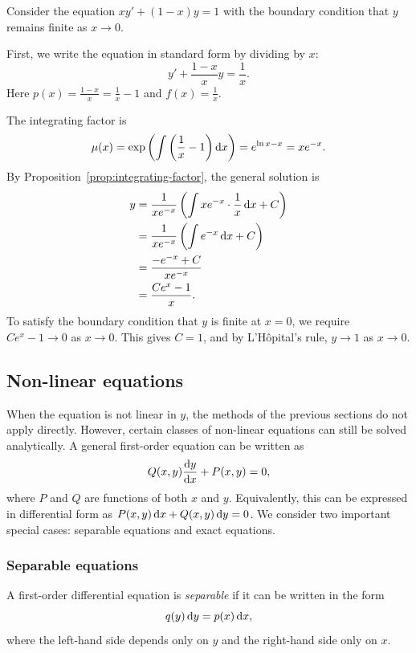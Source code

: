 \documentclass[a4paper]{article}
\begin{document}
\begin{eg}
  Consider the equation $xy' + (1 - x)y = 1$ with the boundary condition that $y$ remains finite as $x \to 0$.

  First, we write the equation in standard form by dividing by $x$:
  \[
    y' + \frac{1 - x}{x} y = \frac{1}{x}.
  \]
  Here $p(x) = \frac{1-x}{x} = \frac{1}{x} - 1$ and $f(x) = \frac{1}{x}$.

  The integrating factor is
  \[
    \mu(x) = \exp\left(\int \left(\frac{1}{x} - 1\right)\mathrm{d} x\right) = e^{\ln x - x} = xe^{-x}.
  \]
  By Proposition~\ref{prop:integrating-factor}, the general solution is
  \begin{align*}
    y &= \frac{1}{xe^{-x}}\left(\int xe^{-x} \cdot \frac{1}{x}\,\mathrm{d} x + C\right)\\
    &= \frac{1}{xe^{-x}}\left(\int e^{-x}\,\mathrm{d} x + C\right)\\
    &= \frac{-e^{-x} + C}{xe^{-x}}\\
    &= \frac{Ce^x - 1}{x}.
  \end{align*}
  To satisfy the boundary condition that $y$ is finite at $x = 0$, we require $Ce^x - 1 \to 0$ as $x \to 0$. This gives $C = 1$, and by L'H\^opital's rule, $y \to 1$ as $x \to 0$.
\end{eg}

\subsection{Non-linear equations}
\begin{remark}
  When the equation is not linear in $y$, the methods of the previous sections do not apply directly. However, certain classes of non-linear equations can still be solved analytically. A general first-order equation can be written as
  \[
    Q(x, y)\frac{\mathrm{d} y}{\mathrm{d} x} + P(x, y) = 0,
  \]
  where $P$ and $Q$ are functions of both $x$ and $y$. Equivalently, this can be expressed in differential form as $P(x,y)\,\mathrm{d} x + Q(x,y)\,\mathrm{d} y = 0$. We consider two important special cases: separable equations and exact equations.
\end{remark}

\subsubsection{Separable equations}
\begin{defi}
  A first-order differential equation is \emph{separable} if it can be written in the form
  \[
    q(y)\,\mathrm{d} y = p(x)\,\mathrm{d} x,
  \]
  where the left-hand side depends only on $y$ and the right-hand side only on $x$.
\end{defi}
\end{document}
